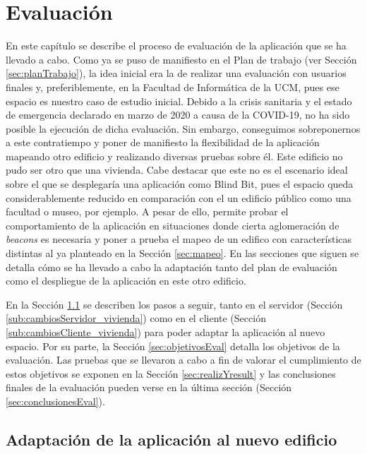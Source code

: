 \chapter{Evaluación}
\label{cap:evaluacion}

En este capítulo se describe el proceso de evaluación de la aplicación que se ha llevado a cabo. Como ya se puso de manifiesto en el Plan de trabajo (ver Sección \ref{sec:planTrabajo}), la idea inicial era la de realizar una evaluación con usuarios finales y, preferiblemente, en la Facultad de Informática de la UCM, pues ese espacio es nuestro caso de estudio inicial. Debido a la crisis sanitaria y el estado de emergencia declarado en marzo de 2020 a causa de la COVID-19, no ha sido posible la ejecución de dicha evaluación. Sin embargo, conseguimos sobreponernos a este contratiempo y poner de manifiesto la flexibilidad de la aplicación mapeando otro edificio y realizando diversas pruebas sobre él. Este edificio no pudo ser otro que una vivienda. Cabe destacar que este no es el escenario ideal sobre el que se desplegaría una aplicación como Blind Bit, pues el espacio queda considerablemente reducido en comparación con el un edificio público como una facultad o museo, por ejemplo. A pesar de ello, permite probar el comportamiento de la aplicación en situaciones donde cierta aglomeración de \textit{beacons} es necesaria y poner a prueba el mapeo de un edifico con características distintas al ya planteado en la Sección \ref{sec:mapeo}. En las secciones que siguen se detalla cómo se ha llevado a cabo la adaptación tanto del plan de evaluación como el despliegue de la aplicación en este otro edificio.

En la Sección \ref{sec:adaptacionApp} se describen los pasos a seguir, tanto en el servidor (Sección \ref{sub:cambiosServidor_vivienda}) como en el cliente (Sección \ref{sub:cambiosCliente_vivienda}) para poder adaptar la aplicación al nuevo espacio. Por su parte, la Sección \ref{sec:objetivosEval} detalla los objetivos de la evaluación. Las pruebas que se llevaron a cabo a fin de valorar el cumplimiento de estos objetivos se exponen en la Sección \ref{sec:realizYresult} y las conclusiones finales de la evaluación pueden verse en la última sección (Sección \ref{sec:conclusionesEval}).


\section{Adaptación de la aplicación al nuevo edificio}
\label{sec:adaptacionApp}

